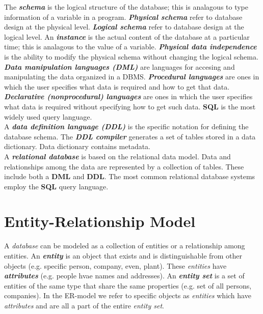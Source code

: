 \documentclass{article}
\newcommand{\bold}[1]{\textbf{#1}}
\newcommand{\define}[1]{\textbf{\textit{#1}}}
\begin{document}
The \define{schema} is the logical structure of the database; this is analagous to type information of a variable in a program. \define{Physical schema} refer to database design at the physical level. \define{Logical schema} refer to database design at the logical level. An \define{instance} is the actual content of the database at a particular time; this is analagous to the value of a variable. \define{Physical data independence} is the ability to modify the physical schema without changing the logical schema. \\ 

\define{Data manipulation languages (DML)} are languages for accesing and manipulating the data organized in a DBMS. \define{Procedural languages} are ones in which the user specifies what data is required and how to get that data. \define{Declarative (nonprocedural) languages} are ones in which the user specifies what data is required without specifying how to get such data. \bold{SQL} is the most widely used query language. \\ 

A \define{data definition language (DDL)} is the specific notation for defining the database schema. The \define{DDL compiler} generates a set of tables stored in a data dictionary. Data dictionary contains metadata. \\ 

A \define{relational database} is based on the relational data model. Data and relationships among the data are represented by a collection of tables. These include both a \bold{DML} and \bold{DDL}. The most common relational database systems employ the \bold{SQL} query language. 

\section{Entity-Relationship Model}

A \emph{database} can be modeled as a collection of entities or a relationship among entities. An \define{entity} is an object that exists and is distinguishable from other objects (e.g. specific person, company, even, plant). These \emph{entities} have \define{attributes} (e.g. people hvae names and addresses). An \define{entity set} is a set of entities of the same type that share the same properties (e.g. set of all persons, companies). In the ER-model we refer to specific objects as \emph{entities} which have \emph{attributes} and are all a part of the entire \emph{entity set}. \\ 
\end{document}
